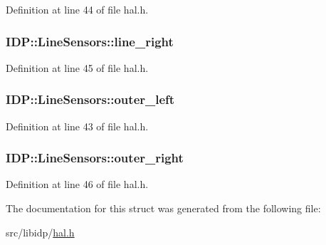 Definition at line 44 of file hal.h.

\hypertarget{structIDP_1_1LineSensors_a03e1692ac462e2e6744c9d5a7656c6f1}{
\subsubsection[{line\_\-right}]{ {\bf IDP::LineSensors::line\_\-right}}}
\label{structIDP_1_1LineSensors_a03e1692ac462e2e6744c9d5a7656c6f1}


Definition at line 45 of file hal.h.

\hypertarget{structIDP_1_1LineSensors_a009bf6abf88cf3c732545da20148ba5e}{
\subsubsection[{outer\_\-left}]{ {\bf IDP::LineSensors::outer\_\-left}}}
\label{structIDP_1_1LineSensors_a009bf6abf88cf3c732545da20148ba5e}


Definition at line 43 of file hal.h.

\hypertarget{structIDP_1_1LineSensors_afa87dc008f415429d15e35a49d52083c}{
\subsubsection[{outer\_\-right}]{ {\bf IDP::LineSensors::outer\_\-right}}}
\label{structIDP_1_1LineSensors_afa87dc008f415429d15e35a49d52083c}


Definition at line 46 of file hal.h.



The documentation for this struct was generated from the following file:\begin{DoxyCompactItemize}
\item 
src/libidp/\hyperlink{hal_8h}{hal.h}\end{DoxyCompactItemize}
